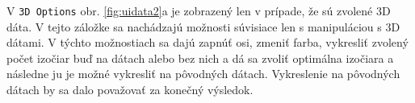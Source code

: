 \documentclass[a4paper,11pt,oneside]{article}%
\begin{document}
\begin{figure}[H]%
    \centering
    \qquad
    \caption{}%
    \label{fig:uidata1}%
\end{figure}

V \texttt{3D Options} obr. \ref{fig:uidata2}a je zobrazený len v prípade, že sú zvolené 3D dáta. V tejto záložke sa nachádzajú možnosti súvisiace len s manipuláciou s 3D dátami. V týchto možnostiach sa dajú zapnúť osi, zmeniť farba, vykresliť zvolený počet izočiar buď na dátach alebo bez nich a dá sa zvoliť optimálna izočiara a následne ju je možné vykresliť na pôvodných dátach. Vykreslenie na pôvodných dátach by sa dalo považovať za konečný výsledok.
\end{document}
